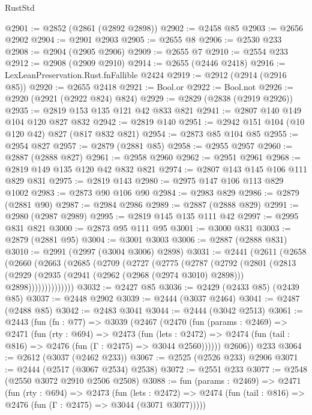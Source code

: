 \begin{lexlean}{RustStd}
\begin{coremodule}
@2901 := @2852 (@2861 (@2892 @2898))
@2902 := @2458 @85
@2903 := @2656 @2902
@2904 := @2901 @2903
@2905 := @2655 @8
@2906 := @2530 @233
@2908 := @2904 (@2905 @2906)
@2909 := @2655 @7
@2910 := @2554 @233
@2912 := @2908 (@2909 @2910)
@2914 := @2655 (@2446 @2418)
@2916 := LexLeanPreservation.Rust.fnFallible @2424
@2919 := @2912 (@2914 (@2916 @85))
@2920 := @2655 @2418
@2921 := Bool.or
@2922 := Bool.not
@2926 := @2920 (@2921 (@2922 @824) @824)
@2929 := @2829 (@2838 (@2919 @2926))
@2935 := @2819 @153 @135 @121 @42 @833 @821
@2941 := @2807 @140 @149 @104 @120 @827 @832
@2942 := @2819 @140
@2951 := @2942 @151 @104 (@10 @120 @42) @827 (@817 @832 @821)
@2954 := @2873 @85 @104 @85
@2955 := @2954 @827
@2957 := @2879 (@2881 @85)
@2958 := @2955 @2957
@2960 := @2887 (@2888 @827)
@2961 := @2958 @2960
@2962 := @2951 @2961
@2968 := @2819 @149 @135 @120 @42 @832 @821
@2974 := @2807 @143 @145 @106 @111 @829 @831
@2975 := @2819 @143
@2980 := @2975 @147 @106 @113 @829 @1002
@2983 := @2873 @90 @106 @90
@2984 := @2983 @829
@2986 := @2879 (@2881 @90)
@2987 := @2984 @2986
@2989 := @2887 (@2888 @829)
@2991 := @2980 (@2987 @2989)
@2995 := @2819 @145 @135 @111 @42
@2997 := @2995 @831 @821
@3000 := @2873 @95 @111 @95
@3001 := @3000 @831
@3003 := @2879 (@2881 @95)
@3004 := @3001 @3003
@3006 := @2887 (@2888 @831)
@3010 := @2991 (@2997 (@3004 @3006) @2898)
@3031 := @2441
    (@2611
      (@2658
        (@2660
          (@2663
            (@2685
              (@2709
                (@2727
                  (@2775
                    (@2787
                      (@2792
                        (@2801
                          (@2813
                            (@2929
                              (@2935 (@2941 (@2962 (@2968 (@2974 @3010) @2898))) @2898))))))))))))))
@3032 := @2427 @85
@3036 := @2429 (@2433 @85) (@2439 @85)
@3037 := @2448 @2902
@3039 := @2444 (@3037 @2464)
@3041 := @2487 (@2488 @85)
@3042 := @2483 @3041
@3044 := @2444 (@3042 @2513)
@3061 := @2443
    (fun (fn : @77) =>
    @3039
      (@2467
        (@2470
          (fun (params : @2469) =>
          @2471
            (fun (rty : @694) =>
            @2473
              (fun (lets : @2472) =>
              @2474 (fun (tail : @816) => @2476 (fun (Γ : @2475) => @3044 @2560))))))
        @2606))
    @233
@3064 := @2612 (@3037 (@2462 @233))
@3067 := @2525 (@2526 @233) @2906
@3071 := @2444 (@2517 (@3067 @2534) @2538)
@3072 := @2551 @233
@3077 := @2548 (@2550 @3072 @2910 @2506 @2508)
@3088 := fun (params : @2469) =>
  @2471
    (fun (rty : @694) =>
    @2473
      (fun (lets : @2472) =>
      @2474 (fun (tail : @816) => @2476 (fun (Γ : @2475) => @3044 (@3071 @3077)))))

\end{coremodule}
\end{lexlean}
